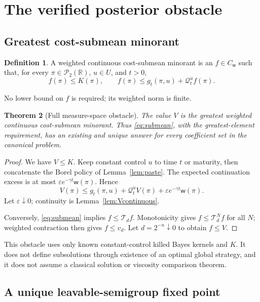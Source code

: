 \documentclass[11pt,a4paper]{article}
\newtheorem{theorem}{Theorem}[section]
\theoremstyle{definition}
\newtheorem{definition}[theorem]{Definition}
\theoremstyle{remark}
\newcommand{\R}{\mathbb R}
\newcommand{\Ptwo}{\mathcal P_2(\R)}
\newcommand{\CW}{C_{\mathsf w}}
\newcommand{\wt}{\mathsf w}
\newcommand{\cQ}{\mathcal Q}
\newcommand{\cT}{\mathcal T}
\begin{document}
\section{The verified posterior obstacle}

\subsection{Greatest cost-submean minorant}

\begin{definition}
A weighted continuous cost-submean minorant is an \(f\in\CW\) such
that, for every \(\pi\in\Ptwo\), \(u\in U\), and \(t>0\),
\begin{equation}\label{eq:submean}
 f(\pi)\leq K(\pi),\qquad
 f(\pi)\leq g_t(\pi,u)+\cQ_t^u f(\pi).
\end{equation}
\end{definition}
No lower bound on \(f\) is required; its weighted norm is finite.

\begin{theorem}[Full measure-space obstacle]\label{thm:obstacle}
The value \(V\) is the greatest weighted continuous cost-submean
minorant. Thus \eqref{eq:submean}, with the greatest-element
requirement, has an existing and unique answer for every coefficient
set in the canonical problem.
\end{theorem}
\begin{proof}
We have \(V\leq K\). Keep constant control \(u\) to time \(t\) or
maturity, then concatenate the Borel policy of
Lemma~\ref{lem:paste}. The expected continuation excess is at most
\(\varepsilon e^{-\gamma t}\wt(\pi)\). Hence
\[
 V(\pi)\leq g_t(\pi,u)+\cQ_t^uV(\pi)
                  +\varepsilon e^{-\gamma t}\wt(\pi).
\]
Let \(\varepsilon\downarrow0\); continuity is
Lemma~\ref{lem:Vcontinuous}.

Conversely, \eqref{eq:submean} implies \(f\leq\cT_df\).
Monotonicity gives \(f\leq\cT_d^Nf\) for all \(N\); weighted
contraction then gives \(f\leq v_d\).
Let \(d=2^{-n}\downarrow0\) to obtain \(f\leq V\).
\end{proof}

This obstacle uses only known constant-control killed Bayes kernels
and \(K\). It does not define subsolutions through existence of an
optimal global strategy, and it does not assume a classical solution
or viscosity comparison theorem.

\subsection{A unique leavable-semigroup fixed point}
\end{document}
